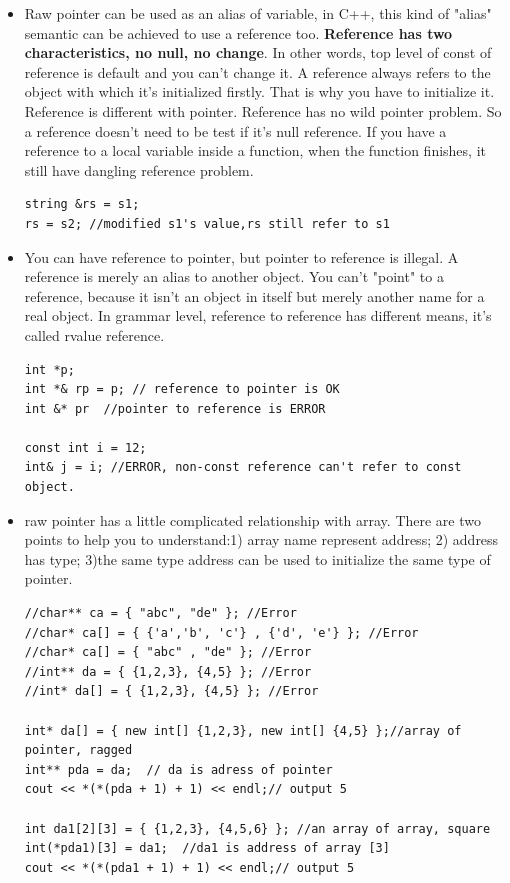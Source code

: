 \documentclass[a4paper,11pt,twoside]{book}
\begin{document}
\begin{itemize}
	\item Raw pointer can be used as an alias of variable, in C++, this kind of "alias" semantic can be achieved to use a reference too.  \textbf{Reference has two characteristics, no null, no change}. In other words, top level of const of reference is default and you can't change it. A reference always refers to the object with which it's initialized firstly. That is why you have to initialize it. Reference is different with pointer. Reference has no wild pointer problem. So a reference doesn't need to be test if it's null reference. If you have a reference to a local variable inside a function, when the function finishes, it still have dangling reference problem. 
\begin{lstlisting}[numbers = none]
string &rs = s1;
rs = s2; //modified s1's value,rs still refer to s1
\end{lstlisting}	
	
	\item You can have reference to pointer, but pointer to reference is illegal. A reference is merely an alias to another object. You can't "point" to a reference, because it isn't an object in itself but merely another name for a real object. In grammar level, reference to reference has different means, it's called rvalue reference. 
\begin{lstlisting}[numbers=none]
int *p;
int *& rp = p; // reference to pointer is OK
int &* pr  //pointer to reference is ERROR

const int i = 12;
int& j = i; //ERROR, non-const reference can't refer to const object.
\end{lstlisting}	

	\item raw pointer has a little complicated relationship with array. There are two points to help you to understand:1) array name represent address; 2) address has type; 3)the same type address can be used to initialize the same type of pointer.   
\begin{lstlisting}
//char** ca = { "abc", "de" }; //Error
//char* ca[] = { {'a','b', 'c'} , {'d', 'e'} }; //Error
//char* ca[] = { "abc" , "de" }; //Error
//int** da = { {1,2,3}, {4,5} }; //Error
//int* da[] = { {1,2,3}, {4,5} }; //Error

int* da[] = { new int[] {1,2,3}, new int[] {4,5} };//array of pointer, ragged
int** pda = da;  // da is adress of pointer
cout << *(*(pda + 1) + 1) << endl;// output 5

int da1[2][3] = { {1,2,3}, {4,5,6} }; //an array of array, square
int(*pda1)[3] = da1;  //da1 is address of array [3]
cout << *(*(pda1 + 1) + 1) << endl;// output 5


\end{lstlisting}
\end{itemize}
\end{document}
